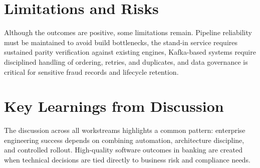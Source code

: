 \section{Limitations and Risks}

Although the outcomes are positive, some limitations remain. Pipeline reliability must be maintained to avoid build bottlenecks, the stand-in service requires sustained parity verification against existing engines, Kafka-based systems require disciplined handling of ordering, retries, and duplicates, and data governance is critical for sensitive fraud records and lifecycle retention.

\section{Key Learnings from Discussion}

The discussion across all workstreams highlights a common pattern: enterprise engineering success depends on combining automation, architecture discipline, and controlled rollout. High-quality software outcomes in banking are created when technical decisions are tied directly to business risk and compliance needs.